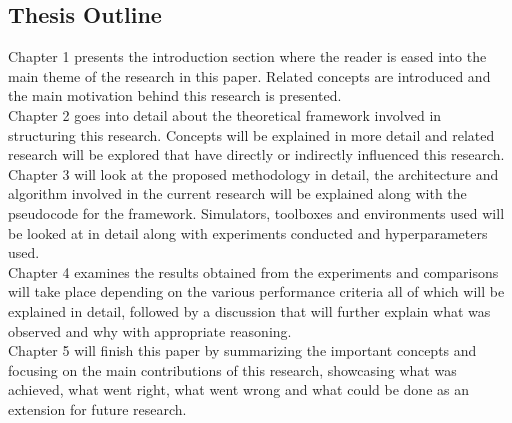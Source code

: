 \subsection{Thesis Outline}

Chapter 1 presents the introduction section where the reader is eased into the main theme of the research in this paper. Related concepts are introduced and the main motivation behind this research is presented. \\

Chapter 2 goes into detail about the theoretical framework involved in structuring this research. Concepts will be explained in more detail and related research will be explored that have directly or indirectly influenced this research. \\

Chapter 3 will look at the proposed methodology in detail, the architecture and algorithm involved in the current research will be explained along with the pseudocode for the framework. Simulators, toolboxes and environments used will be looked at in detail along with experiments conducted and hyperparameters used. \\

Chapter 4 examines the results obtained from the experiments and comparisons will take place depending on the various performance criteria all of which will be explained in detail, followed by a discussion that will further explain what was observed and why with appropriate reasoning. \\

Chapter 5 will finish this paper by summarizing the important concepts and focusing on the main contributions of this research, showcasing what was achieved, what went right, what went wrong and what could be done as an extension for future research. \\
